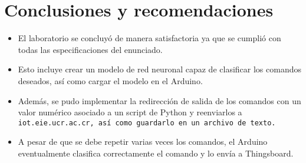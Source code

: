 \section{Conclusiones y recomendaciones}
\begin{itemize}
    \item El laboratorio se concluyó de manera satisfactoria ya que se cumplió con todas las especificaciones del enunciado.
    \item Esto incluye crear un modelo de red neuronal capaz de clasificar los comandos deseados, así como cargar el modelo en el Arduino.
    \item Además, se pudo implementar la redirección de salida de los comandos con un valor numérico asociado a un script de Python y reenviarlos a \tt{iot.eie.ucr.ac.cr}, así como guardarlo en un archivo de texto.
    \item A pesar de que se debe repetir varias veces los comandos, el Arduino eventualmente clasifica correctamente el comando y lo envía a Thingsboard.
\end{itemize}



 





